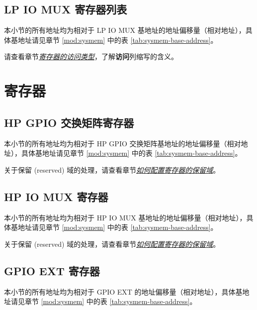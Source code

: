 \documentclass[main\_\_CN.tex]{subfiles}
\begin{document}


\subsection{LP IO MUX 寄存器列表}
\label{sec:lp-iomux-register-summ}

本小节的所有地址均为相对于 LP IO MUX 基地址的地址偏移量（相对地址），具体基地址请见章节 \ref{mod:sysmem} \textit{} 中的表 \ref{tab:sysmem-base-address}。

请查看章节\hyperref[glossary-access-types]{\textit{寄存器的访问类型}}，了解\textbf{访问}列缩写的含义。




\section{寄存器}

\subsection{HP GPIO 交换矩阵寄存器}
本小节的所有地址均为相对于 HP GPIO 交换矩阵基地址的地址偏移量（相对地址），具体基地址请见章节 \ref{mod:sysmem} \textit{} 中的表 \ref{tab:sysmem-base-address}。

关于保留 (reserved) 域的处理，请查看章节\hyperref[programming-reserved-field]{\textit{如何配置寄存器的保留域}}。



\subsection{HP IO MUX 寄存器}
本小节的所有地址均为相对于 HP IO MUX 基地址的地址偏移量（相对地址），具体基地址请见章节 \ref{mod:sysmem} \textit{} 中的表 \ref{tab:sysmem-base-address}。

关于保留 (reserved) 域的处理，请查看章节\hyperref[programming-reserved-field]{\textit{如何配置寄存器的保留域}}。



\subsection{GPIO EXT 寄存器}

本小节的所有地址均为相对于 GPIO EXT 的地址偏移量（相对地址），具体基地址请见章节 \ref{mod:sysmem} \textit{} 中的表 \ref{tab:sysmem-base-address}。
\end{document}
